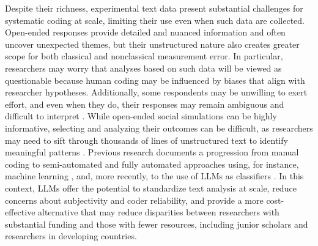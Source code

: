 \documentclass[11pt]{article}
\begin{document}
\begin{sloppypar}
Despite their richness, experimental text data present substantial challenges for systematic coding at scale, limiting their use even when such data are collected. Open-ended responses provide detailed and nuanced information and often uncover unexpected themes, but their unstructured nature also creates greater scope for both classical and nonclassical measurement error. In particular, researchers may worry that analyses based on such data will be viewed as questionable because human coding may be influenced by biases that align with researcher hypotheses. Additionally, some respondents may be unwilling to exert effort, and even when they do, their responses may remain ambiguous and difficult to interpret \citep{haaland2025understanding}. While open-ended social simulations can be highly informative, selecting and analyzing their outcomes can be difficult, as researchers may need to sift through thousands of lines of unstructured text to identify meaningful patterns \citep{charness2023generation}. Previous research documents a progression from manual coding \citep{Andreoni2011, Burchardi2014, nielsen2019teams, ederer_schneider_2022, brandts_cooper_2025} to semi-automated and fully automated approaches using, for instance, machine learning \citep{penczynski2019using, hausladen2024predicting}, and, more recently, to the use of LLMs as classifiers \citep{Korinek2023, ChopraHaaland2023, Celebi2024, Bermejo2025, haaland2025understanding}. In this context, LLMs offer the potential to standardize text analysis at scale, reduce concerns about subjectivity and coder reliability, and provide a more cost-effective alternative that may reduce disparities between researchers with substantial funding and those with fewer resources, including junior scholars and researchers in developing countries.


\end{sloppypar}
\end{document}
